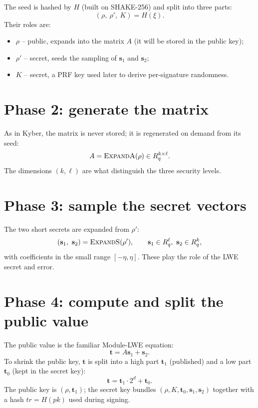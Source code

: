 The seed is hashed by $H$ (built on SHAKE-256) and split into three parts:
\[
(\rho,\ \rho',\ K) = H(\xi).
\]
Their roles are:
\begin{itemize}
  \item $\rho$ -- public, expands into the matrix $A$ (it will be stored in the public key);
  \item $\rho'$ -- secret, seeds the sampling of $\mathbf{s}_1$ and $\mathbf{s}_2$;
  \item $K$ -- secret, a PRF key used later to derive per-signature randomness.
\end{itemize}

\section{Phase 2: generate the matrix}

As in Kyber, the matrix is never stored; it is regenerated on demand from its seed:
\[
A = \textsc{ExpandA}(\rho) \in R_q^{k\times \ell}.
\]
The dimensions $(k,\ell)$ are what distinguish the three security levels.

\section{Phase 3: sample the secret vectors}

The two short secrets are expanded from $\rho'$:
\[
(\mathbf{s}_1,\ \mathbf{s}_2) = \textsc{ExpandS}(\rho'),\qquad \mathbf{s}_1\in R_q^\ell,\ \mathbf{s}_2\in R_q^k,
\]
with coefficients in the small range $[-\eta,\eta]$. These play the role of the LWE secret and error.

\section{Phase 4: compute and split the public value}

The public value is the familiar Module-LWE equation:
\[
\mathbf{t} = A\mathbf{s}_1 + \mathbf{s}_2.
\]
To shrink the public key, $\mathbf{t}$ is split into a high part $\mathbf{t}_1$ (published) and a low part $\mathbf{t}_0$ (kept in the secret key):
\[
\mathbf{t} = \mathbf{t}_1\cdot 2^{d} + \mathbf{t}_0.
\]
The public key is $(\rho, \mathbf{t}_1)$; the secret key bundles $(\rho, K, \mathbf{t}_0, \mathbf{s}_1, \mathbf{s}_2)$ together with a hash $tr = H(pk)$ used during signing.

